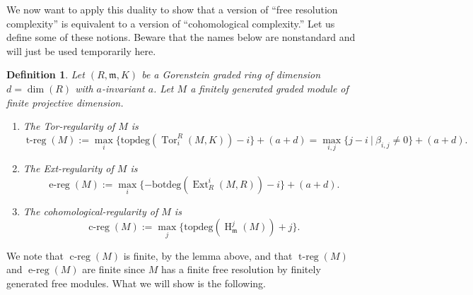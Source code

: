 \documentclass[11pt]{book}
\newtheorem{definition}[theorem]{Definition}
\numberwithin{equation}{section}
\numberwithin{theorem}{chapter}
\theoremstyle{definition}
\newtheorem*{basic properties}{Basic Properties}
\newtheorem*{Important Remark}{Important Remark}
\theoremstyle{remark}
\newcommand{\m}{\mathfrak{m}}
\newcommand{\Ext}{\operatorname{Ext}}
\newcommand{\Tor}{\operatorname{Tor}}
\renewcommand{\dim}{\operatorname{dim}}
\newcommand{\Treg}{\operatorname{t-reg}}
\newcommand{\Ereg}{\operatorname{e-reg}}
\newcommand{\Lreg}{\operatorname{c-reg}}
\newcommand{\tp}{\mathrm{topdeg}}
\newcommand{\bt}{\mathrm{botdeg}}
\renewcommand{\H}{\operatorname{H}}
\begin{document}
We now want to apply this duality to show that a version of ``free resolution complexity'' is equivalent to a version of ``cohomological complexity.'' Let us define some of these notions. Beware that the names below are nonstandard and will just be used temporarily here.

\begin{definition}
	Let $(R,\m,K)$ be a Gorenstein graded ring of dimension $d=\dim(R)$ with $a$-invariant $a$. Let $M$ a finitely generated graded module of finite projective dimension. 
	\begin{enumerate}
		\item The \emph{Tor-regularity}\index{$\Treg(M)$} of $M$ is 
		\[\Treg(M):=\max_i\{ \tp(\Tor^R_i(M,K))-i\}+(a+d)= \max_{i,j}\{  j-i \ | \ \beta_{i,j}\neq 0\} +(a+d).\]
		
		\item The \emph{Ext-regularity}\index{$\Ereg(M)$} of $M$ is 
		\[\Ereg(M):=\max_i\{ -\bt(\Ext_R^i(M,R))-i\}+(a+d).\]
		
		\item The \emph{cohomological-regularity}\index{$\Lreg(M)$} of $M$ is 
		\[\Lreg(M):=\max_j\{ \tp(\H^j_{\m}(M))+j\}  .\]
	\end{enumerate}
\end{definition}

We note that $\Lreg(M)$ is finite, by the lemma above, and that $\Treg(M)$ and $\Ereg(M)$ are finite since $M$ has a finite free resolution by finitely generated free modules.
What we will show is the following.
\end{document}
